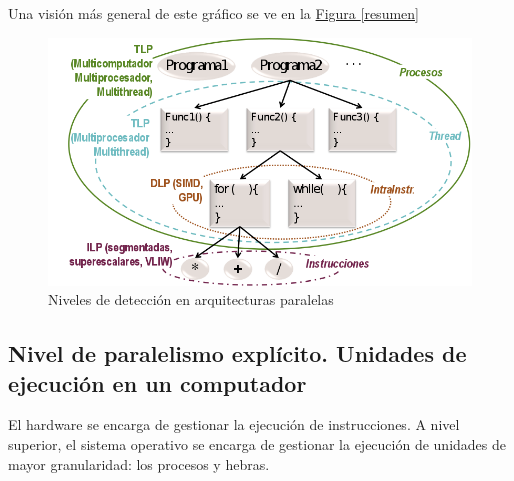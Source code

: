 \documentclass[10pt,a4paper,spanish]{report}
\begin{document}




Una visión más general de este gráfico se ve en la \hyperref[resumen]{Figura \ref*{resumen}}


\begin{figure}[!h]
\centering
\includegraphics[width=1\textwidth]{4}
\caption{Niveles de detección en arquitecturas paralelas}
\label{paralelismo_ap}
\end{figure}

\newpage
\textcolor[rgb]{0.2,0.4,0.8}{\subsection{Nivel de paralelismo explícito. Unidades de ejecución en un computador}}
El hardware se encarga de gestionar la ejecución de instrucciones. A nivel superior, el sistema operativo se encarga de gestionar la ejecución de unidades de mayor granularidad: los procesos y hebras.
\end{document}
